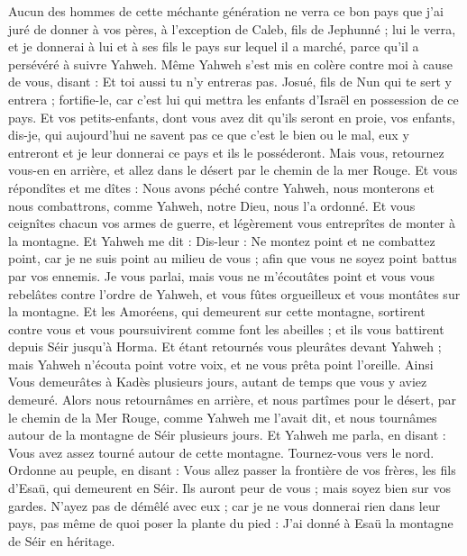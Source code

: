 \begin{multicols}{2}
Aucun des hommes de cette méchante génération ne verra ce bon pays que j'ai juré de donner à vos pères,
à l'exception de Caleb, fils de Jephunné ; lui le verra, et je donnerai à lui et à ses fils le pays sur lequel il a marché, parce qu'il a persévéré à suivre Yahweh.
Même Yahweh s'est mis en colère contre moi à cause de vous, disant : Et toi aussi tu n'y entreras pas.
Josué, fils de Nun qui te sert y entrera ; fortifie-le, car c'est lui qui mettra les enfants d'Israël en possession de ce pays.
Et vos petits-enfants, dont vous avez dit qu'ils seront en proie, vos enfants, dis-je, qui aujourd'hui ne savent pas ce que c'est le bien ou le mal, eux y entreront et je leur donnerai ce pays et ils le posséderont.
Mais vous, retournez vous-en en arrière, et allez dans le désert par le chemin de la mer Rouge.
Et vous répondîtes et me dîtes : Nous avons péché contre Yahweh, nous monterons et nous combattrons, comme Yahweh, notre Dieu, nous l'a ordonné. Et vous ceignîtes chacun vos armes de guerre, et légèrement vous entreprîtes de monter à la montagne.
Et Yahweh me dit : Dis-leur : Ne montez point et ne combattez point, car je ne suis point au milieu de vous ; afin que vous ne soyez point battus par vos ennemis.
Je vous parlai, mais vous ne m'écoutâtes point et vous vous rebelâtes contre l'ordre de Yahweh, et vous fûtes orgueilleux et vous montâtes sur la montagne.
Et les Amoréens, qui demeurent sur cette montagne, sortirent contre vous et vous poursuivirent comme font les abeilles ; et ils vous battirent depuis Séir jusqu'à Horma.
Et étant retournés vous pleurâtes devant Yahweh ; mais Yahweh n'écouta point votre voix, et ne vous prêta point l'oreille.
Ainsi Vous demeurâtes à Kadès plusieurs jours, autant de temps que vous y aviez demeuré.
\VerseOne{}Alors nous retournâmes en arrière, et nous partîmes pour le désert, par le chemin de la Mer Rouge, comme Yahweh me l'avait dit, et nous tournâmes autour de la montagne de Séir plusieurs jours.
Et Yahweh me parla, en disant :
Vous avez assez tourné autour de cette montagne. Tournez-vous vers le nord.
Ordonne au peuple, en disant : Vous allez passer la frontière de vos frères, les fils d'Esaü, qui demeurent en Séir. Ils auront peur de vous ; mais soyez bien sur vos gardes.
N'ayez pas de démêlé avec eux ; car je ne vous donnerai rien dans leur pays, pas même de quoi poser la plante du pied : J'ai donné à Esaü la montagne de Séir en héritage.

\end{multicols}
